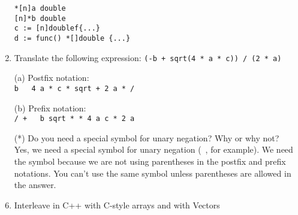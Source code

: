 \documentclass{article}
\begin{document}
\begin{enumerate}
\begin{verbatim}
*[n]a double
[n]*b double
c := [n]doublef{...}
d := func() *[]double {...}
\end{verbatim}
\pagebreak
\item Translate the following expression: \texttt{(-b + sqrt(4 * a * c)) / (2 * a)}
    \item[(a)]Postfix notation: \\\texttt{b ~ 4 a * c * sqrt + 2 a * /} \\
    \item[(b)]Prefix notation: \\\texttt{/ + ~ b sqrt * * 4 a c * 2 a} \\ 
    \item[(*)] Do you need a special symbol for unary negation? Why or why not? \\
    Yes, we need a special symbol for unary negation (~, for example). We need the symbol because we are not using parentheses in the postfix and prefix notations. You can't use the same symbol unless parentheses are allowed in the answer.
\pagebreak
\item Interleave in C++ with C-style arrays and with Vectors

\pagebreak
\end{enumerate}
\end{document}
